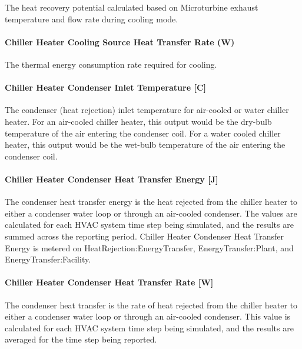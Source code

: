 The heat recovery potential calculated based on Microturbine exhaust temperature and flow rate during cooling mode.

\paragraph{Chiller Heater Cooling Source Heat Transfer Rate (W)}\label{chiller-heater-cooling-source-heat-transfer-rate-w}

The thermal energy consumption rate required for cooling.

\paragraph{Chiller Heater Condenser Inlet Temperature {[}C{]}}\label{chiller-heater-condenser-inlet-temperature-c}

The condenser (heat rejection) inlet temperature for air-cooled or water chiller heater. For an air-cooled chiller heater, this output would be the dry-bulb temperature of the air entering the condenser coil. For a water cooled chiller heater, this output would be the wet-bulb temperature of the air entering the condenser coil.

\paragraph{Chiller Heater Condenser Heat Transfer Energy {[}J{]}}\label{chiller-heater-condenser-heat-transfer-energy-j}

The condenser heat transfer energy is the heat rejected from the chiller heater to either a condenser water loop or through an air-cooled condenser. The values are calculated for each HVAC system time step being simulated, and the results are summed across the reporting period. Chiller Heater Condenser Heat Transfer Energy is metered on HeatRejection:EnergyTransfer, EnergyTransfer:Plant, and EnergyTransfer:Facility.

\paragraph{Chiller Heater Condenser Heat Transfer Rate {[}W{]}}\label{chiller-heater-condenser-heat-transfer-rate-w}

The condenser heat transfer is the rate of heat rejected from the chiller heater to either a condenser water loop or through an air-cooled condenser. This value is calculated for each HVAC system time step being simulated, and the results are averaged for the time step being reported.

